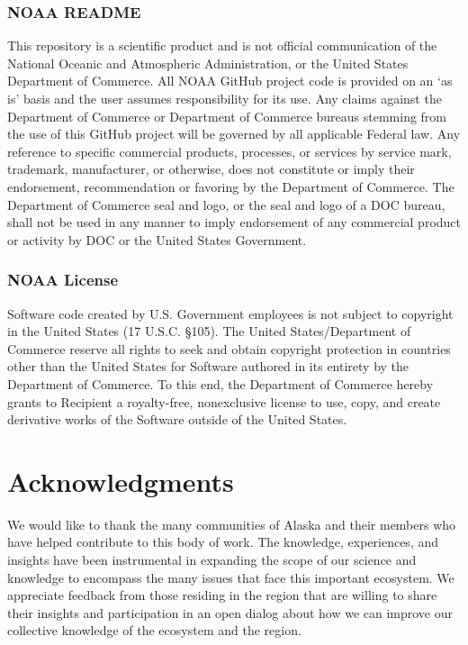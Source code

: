 \documentclass[
  letterpaper,
  oneside,
  open=any]{scrbook}
\begin{document}
\hypertarget{noaa-readme-1}{%
\subsection{NOAA README}\label{noaa-readme-1}}

This repository is a scientific product and is not official
communication of the National Oceanic and Atmospheric Administration, or
the United States Department of Commerce. All NOAA GitHub project code
is provided on an `as is' basis and the user assumes responsibility for
its use. Any claims against the Department of Commerce or Department of
Commerce bureaus stemming from the use of this GitHub project will be
governed by all applicable Federal law. Any reference to specific
commercial products, processes, or services by service mark, trademark,
manufacturer, or otherwise, does not constitute or imply their
endorsement, recommendation or favoring by the Department of Commerce.
The Department of Commerce seal and logo, or the seal and logo of a DOC
bureau, shall not be used in any manner to imply endorsement of any
commercial product or activity by DOC or the United States Government.

\hypertarget{noaa-license-1}{%
\subsection{NOAA License}\label{noaa-license-1}}

Software code created by U.S. Government employees is not subject to
copyright in the United States (17 U.S.C. §105). The United
States/Department of Commerce reserve all rights to seek and obtain
copyright protection in countries other than the United States for
Software authored in its entirety by the Department of Commerce. To this
end, the Department of Commerce hereby grants to Recipient a
royalty-free, nonexclusive license to use, copy, and create derivative
works of the Software outside of the United States.

\hypertarget{acknowledgments}{%
\chapter{Acknowledgments}\label{acknowledgments}}

We would like to thank the many communities of Alaska and their members
who have helped contribute to this body of work. The knowledge,
experiences, and insights have been instrumental in expanding the scope
of our science and knowledge to encompass the many issues that face this
important ecosystem. We appreciate feedback from those residing in the
region that are willing to share their insights and participation in an
open dialog about how we can improve our collective knowledge of the
ecosystem and the region.
\end{document}

